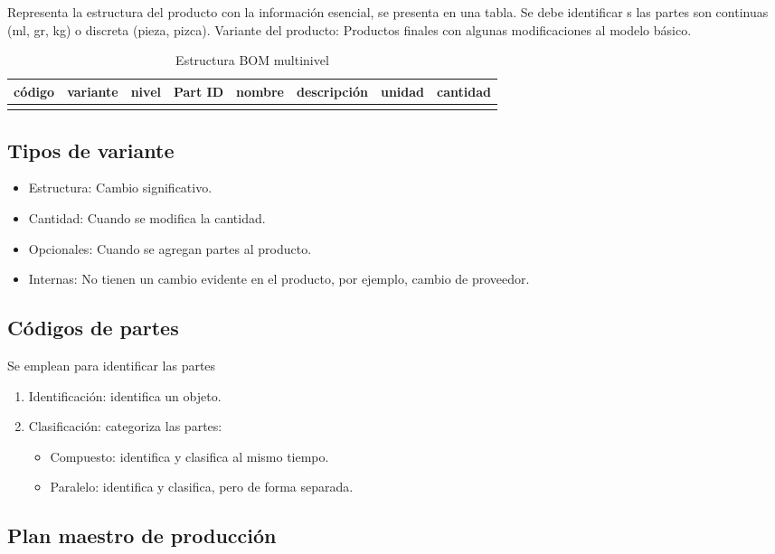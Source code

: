 Representa la estructura del producto con la información esencial, se presenta en una tabla. Se debe identificar s las partes son continuas (ml, gr, kg) o discreta (pieza, pizca). 
Variante del producto: Productos finales con algunas modificaciones al modelo básico. 

\begin{table}[h]
    \centering
    \begin{tabular}{|c|c|c|c|c|c|c|c|}
        \hline
        código & variante & nivel & Part ID & nombre & descripción & unidad & cantidad \\
        \hline
         & & & & & & & \\
        \hline
    \end{tabular}
    \caption{Estructura BOM multinivel}
\end{table}

\subsection{Tipos de variante}
\begin{itemize}
    \item Estructura: Cambio significativo.
    \item Cantidad: Cuando se modifica la cantidad.
    \item Opcionales: Cuando se agregan partes al producto. 
    \item Internas: No tienen un cambio evidente en el producto, por ejemplo, cambio de proveedor. 
\end{itemize}

\subsection{Códigos de partes}
Se emplean para identificar las partes 
\begin{enumerate}
    \item Identificación: identifica un objeto.
    \item Clasificación: categoriza las partes:
        \begin{itemize}
            \item Compuesto: identifica y clasifica al mismo tiempo.
            \item Paralelo: identifica y clasifica, pero de forma separada.
        \end{itemize}
\end{enumerate}

\subsection{Plan maestro de producción}


